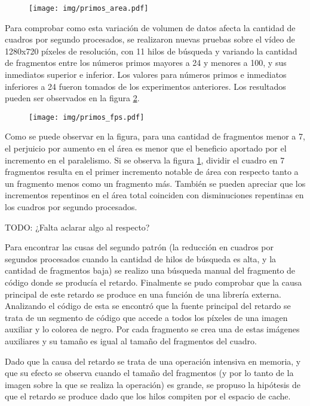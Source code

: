 \begin{figure}[!h]

	\texttt{[image: img/primos\_area.pdf]}
	\caption{}
	\label{primosArea}

\end{figure}

Para comprobar como esta variación de volumen de datos afecta la cantidad de
cuadros por segundo procesados, se realizaron nuevas pruebas sobre el vídeo de
1280x720 píxeles de resolución, con 11 hilos de búsqueda y variando la cantidad
de fragmentos entre los números primos mayores a 24 y menores a 100, y sus
inmediatos superior e inferior. Los valores para números primos e inmediatos
inferiores a 24 fueron tomados de los experimentos anteriores. Los resultados
pueden ser observados en la figura \ref{primosFPS}.

\begin{figure}[!h]

	\texttt{[image: img/primos\_fps.pdf]}
	\caption{}
	\label{primosFPS}

\end{figure}

Como se puede observar en la figura, para una cantidad de fragmentos menor a 7,
el perjuicio por aumento en el área es menor que el beneficio aportado por el
incremento en el paralelismo. Si se observa la figura \ref{primosArea}, dividir
el cuadro en 7 fragmentos resulta en el primer incremento notable de área con
respecto tanto a un fragmento menos como un fragmento más. También se pueden
apreciar que los incrementos repentinos en el área total coinciden con
disminuciones repentinas en los cuadros por segundo procesados.

TODO: ¿Falta aclarar algo al respecto?

Para encontrar las cusas del segundo patrón (la reducción en cuadros por
segundos procesados cuando la cantidad de hilos de búsqueda es alta, y la
cantidad de fragmentos baja) se realizo una búsqueda manual del fragmento de
código donde se producía el retardo. Finalmente se pudo comprobar que la causa
principal de este retardo se produce en una función de una librería externa.
Analizando el código de esta se encontró que la fuente principal del retardo se
trata de un segmento de código que accede a todos los píxeles de una imagen
auxiliar y lo colorea de negro. Por cada fragmento se crea una de estas imágenes
auxiliares y su tamaño es igual al tamaño del fragmentos del cuadro.

Dado que la causa del retardo se trata de una operación intensiva en memoria, y
que su efecto se observa cuando el tamaño del fragmentos (y por lo tanto de la
imagen sobre la que se realiza la operación) es grande, se propuso la hipótesis
de que el retardo se produce dado que los hilos compiten por el espacio de
cache.

